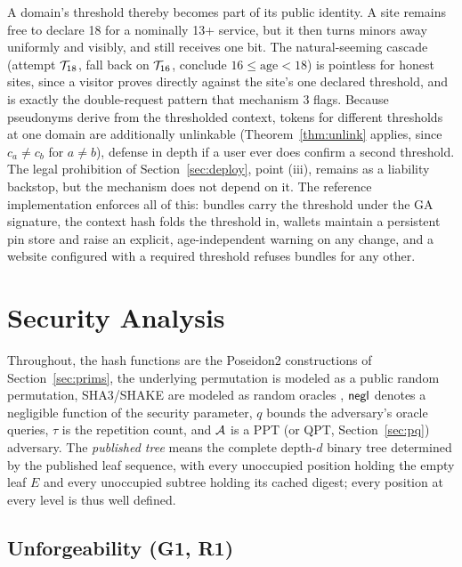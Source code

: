 \documentclass[11pt]{article}
\theoremstyle{definition}
\begin{document}
A domain's threshold thereby becomes part of its public identity. A site remains free to
declare 18 for a nominally 13+ service, but it then turns minors away uniformly and
visibly, and still receives one bit. The natural-seeming cascade (attempt $\mathcal{T}_{18}$, fall
back on $\mathcal{T}_{16}$, conclude $16 \le \mathrm{age} < 18$) is pointless for honest sites,
since a visitor proves directly against the site's one declared threshold, and is exactly
the double-request pattern that mechanism 3 flags. Because pseudonyms derive from the
thresholded context, tokens for different thresholds at one domain are additionally
unlinkable (Theorem~\ref{thm:unlink} applies, since $c_a \ne c_b$ for $a \ne b$), defense
in depth if a user ever does confirm a second threshold. The legal prohibition of
Section~\ref{sec:deploy}, point (iii), remains as a liability backstop, but the mechanism
does not depend on it. The reference implementation enforces all of this: bundles carry
the threshold under the GA signature, the context hash folds the threshold in, wallets
maintain a persistent pin store and raise an explicit, age-independent warning on any
change, and a website configured with a required threshold refuses bundles for any other.

\section{Security Analysis}
\label{sec:security}

Throughout, the hash functions are the Poseidon2 constructions of Section~\ref{sec:prims},
the underlying permutation is modeled as a public random permutation, SHA3/SHAKE are
modeled as random oracles \cite{bellrog}, $\mathsf{negl}$ denotes a negligible function of the
security parameter, $q$ bounds the adversary's oracle queries, $\tau$ is the repetition
count, and $\mathcal{A}$ is a PPT (or QPT, Section~\ref{sec:pq}) adversary. The \emph{published
tree} means the complete depth-$d$ binary tree determined by the published leaf sequence,
with every unoccupied position holding the empty leaf $E$ and every unoccupied subtree
holding its cached digest; every position at every level is thus well defined.

\subsection{Unforgeability (G1, R1)}
\end{document}
